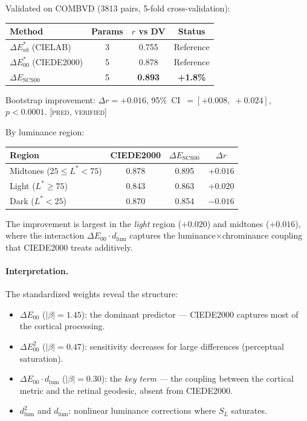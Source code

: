 \documentclass[12pt,a4paper]{article}
\begin{document}
\begin{predictionbox}
Validated on COMBVD (3813 pairs, 5-fold cross-validation):
\begin{center}
\begin{tabular}{lccc}
\toprule
Method & Params & $r$ vs DV & Status \\
\midrule
$\Delta E^*_{ab}$ (CIELAB) & 3 & 0.755 & Reference \\
$\Delta E^*_{00}$ (CIEDE2000) & 5 & 0.878 & Reference \\
$\Delta E_{\mathrm{SCS00}}$ & 5 & \textbf{0.893} & \textbf{+1.8\%} \\
\bottomrule
\end{tabular}
\end{center}
Bootstrap improvement: $\Delta r = +0.016$,
95\%~CI~$= [+0.008,\; +0.024]$, $p < 0.0001$.
\textsc{[pred, verified]}

\medskip
By luminance region:
\begin{center}
\begin{tabular}{lccc}
\toprule
Region & CIEDE2000 & $\Delta E_{\mathrm{SCS00}}$ & $\Delta r$ \\
\midrule
Midtones ($25 \leq L^* < 75$) & 0.878 & 0.895 & $+0.016$ \\
Light ($L^* \geq 75$) & 0.843 & 0.863 & $+0.020$ \\
Dark ($L^* < 25$) & 0.870 & 0.854 & $-0.016$ \\
\bottomrule
\end{tabular}
\end{center}
The improvement is largest in the \emph{light} region ($+0.020$) and
midtones ($+0.016$), where the interaction
$\Delta E_{00} \cdot d_{\mathrm{lum}}$ captures the
luminance$\times$chrominance coupling that CIEDE2000 treats additively.
\end{predictionbox}

\paragraph{Interpretation.}
The standardized weights reveal the structure:
\begin{itemize}[nosep]
\item $\Delta E_{00}$ ($|\beta| = 1.45$): the dominant predictor
  --- CIEDE2000 captures most of the cortical processing.
\item $\Delta E_{00}^2$ ($|\beta| = 0.47$): sensitivity decreases for
  large differences (perceptual saturation).
\item $\Delta E_{00} \cdot d_{\mathrm{lum}}$ ($|\beta| = 0.30$):
  the \emph{key term} --- the coupling between the cortical metric
  and the retinal geodesic, absent from CIEDE2000.
\item $d_{\mathrm{lum}}^2$ and $d_{\mathrm{lum}}$: nonlinear
  luminance corrections where $S_L$ saturates.
\end{itemize}
\end{document}
